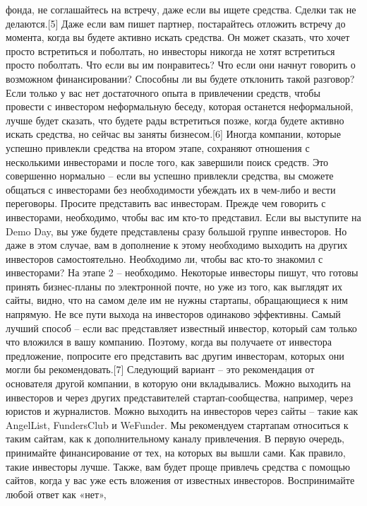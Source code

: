\documentclass[ebook,12pt,oneside,openany]{memoir}
\begin{document}
фонда, не соглашайтесь на встречу, даже если вы ищете средства. Сделки
так не делаются.[5] Даже если вам пишет партнер, постарайтесь отложить
встречу до момента, когда вы будете активно искать средства. Он может
сказать, что хочет просто встретиться и поболтать, но инвесторы
никогда не хотят встретиться просто поболтать. Что если вы им
понравитесь? Что если они начнут говорить о возможном финансировании?
Способны ли вы будете отклонить такой разговор? Если только у вас нет
достаточного опыта в привлечении средств, чтобы провести с инвестором
неформальную беседу, которая останется неформальной, лучше будет
сказать, что будете рады встретиться позже, когда будете активно
искать средства, но сейчас вы заняты бизнесом.[6] Иногда компании,
которые успешно привлекли средства на втором этапе, сохраняют
отношения с несколькими инвесторами и после того, как завершили поиск
средств. Это совершенно нормально – если вы успешно привлекли
средства, вы сможете общаться с инвесторами без необходимости убеждать
их в чем-либо и вести переговоры. Просите представить вас инвесторам.
Прежде чем говорить с инвесторами, необходимо, чтобы вас им кто-то
представил. Если вы выступите на Demo Day, вы уже будете представлены
сразу большой группе инвесторов. Но даже в этом случае, вам в
дополнение к этому необходимо выходить на других инвесторов
самостоятельно. Необходимо ли, чтобы вас кто-то знакомил с
инвесторами? На этапе 2 – необходимо. Некоторые инвесторы пишут, что
готовы принять бизнес-планы по электронной почте, но уже из того, как
выглядят их сайты, видно, что на самом деле им не нужны стартапы,
обращающиеся к ним напрямую. Не все пути выхода на инвесторов
одинаково эффективны. Самый лучший способ – если вас представляет
известный инвестор, который сам только что вложился в вашу компанию.
Поэтому, когда вы получаете от инвестора предложение, попросите его
представить вас другим инвесторам, которых они могли бы
рекомендовать.[7] Следующий вариант – это рекомендация от основателя
другой компании, в которую они вкладывались. Можно выходить на
инвесторов и через других представителей стартап-сообщества, например,
через юристов и журналистов. Можно выходить на инвесторов через сайты
– такие как AngelList, FundersClub и WeFunder. Мы рекомендуем
стартапам относиться к таким сайтам, как к дополнительному каналу
привлечения. В первую очередь, принимайте финансирование от тех, на
которых вы вышли сами. Как правило, такие инвесторы лучше. Также, вам
будет проще привлечь средства с помощью сайтов, когда у вас уже есть
вложения от известных инвесторов. Воспринимайте любой ответ как «нет»,
\end{document}
